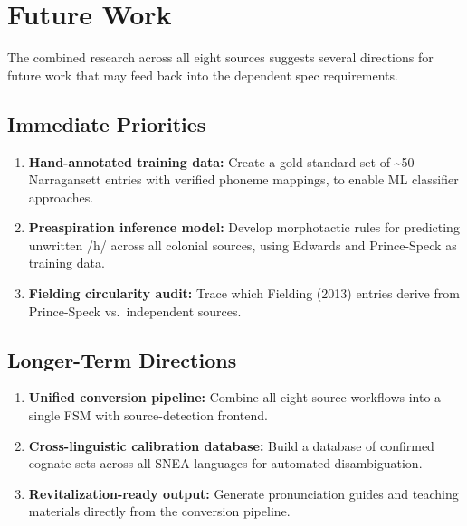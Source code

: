 
\section{Future Work}
\label{sec:future}

The combined research across all eight sources suggests several directions
for future work that may feed back into the dependent spec requirements.

\subsection{Immediate Priorities}

\begin{enumerate}
  \item \textbf{Hand-annotated training data:} Create a gold-standard set of
    \textasciitilde50 Narragansett entries with verified phoneme mappings,
    to enable ML classifier approaches.
  \item \textbf{Preaspiration inference model:} Develop morphotactic rules
    for predicting unwritten /h/ across all colonial sources, using Edwards
    and Prince-Speck as training data.
  \item \textbf{Fielding circularity audit:} Trace which Fielding (2013)
    entries derive from Prince-Speck vs.\ independent sources.
\end{enumerate}

\subsection{Longer-Term Directions}

\begin{enumerate}
  \item \textbf{Unified conversion pipeline:} Combine all eight source
    workflows into a single FSM with source-detection frontend.
  \item \textbf{Cross-linguistic calibration database:} Build a database of
    confirmed cognate sets across all SNEA languages for automated
    disambiguation.
  \item \textbf{Revitalization-ready output:} Generate pronunciation guides
    and teaching materials directly from the conversion pipeline.
\end{enumerate}
